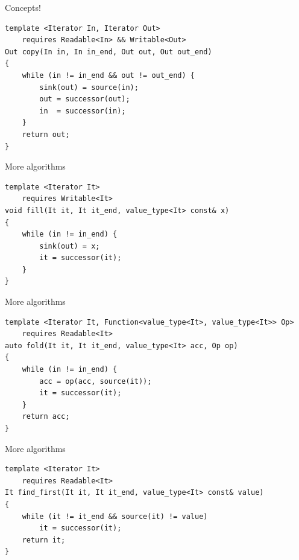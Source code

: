 \documentclass[aspectratio=169]{beamer}
\begin{document}

\begin{frame}[fragile]{Concepts!}
\begin{lstlisting}
template <Iterator In, Iterator Out>
    requires Readable<In> && Writable<Out>
Out copy(In in, In in_end, Out out, Out out_end)
{
    while (in != in_end && out != out_end) {
        sink(out) = source(in);
        out = successor(out);
        in  = successor(in);
    }
    return out;
}
\end{lstlisting}
\end{frame}


\begin{frame}[fragile]{More algorithms}
\begin{lstlisting}
template <Iterator It>
    requires Writable<It>
void fill(It it, It it_end, value_type<It> const& x)
{
    while (in != in_end) {
        sink(out) = x;
        it = successor(it);
    }
}
\end{lstlisting}
\end{frame}


\begin{frame}[fragile]{More algorithms}
  \small
\begin{lstlisting}
template <Iterator It, Function<value_type<It>, value_type<It>> Op>
    requires Readable<It>
auto fold(It it, It it_end, value_type<It> acc, Op op)
{
    while (in != in_end) {
        acc = op(acc, source(it));
        it = successor(it);
    }
    return acc;
}
\end{lstlisting}
\end{frame}


\begin{frame}[fragile]{More algorithms}
\begin{lstlisting}
template <Iterator It>
    requires Readable<It>
It find_first(It it, It it_end, value_type<It> const& value)
{
    while (it != it_end && source(it) != value)
        it = successor(it);
    return it;
}
\end{lstlisting}
\end{frame}
\end{document}
